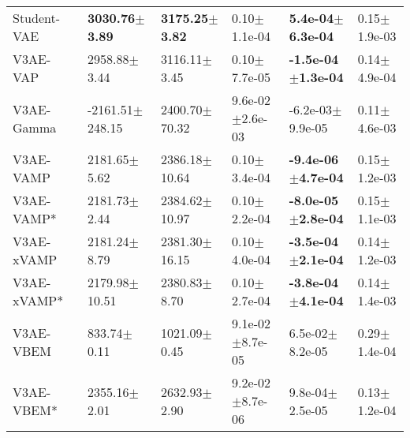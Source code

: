 \begin{tabular}{llllll}
Student-VAE            &  \textbf{3030.76$\pm$3.89} &  \textbf{3175.25$\pm$3.82} &              0.10$\pm$1.1e-04 &   \textbf{5.4e-04$\pm$6.3e-04} &              0.15$\pm$1.9e-03 \\
V3AE-VAP               &           2958.88$\pm$3.44 &           3116.11$\pm$3.45 &              0.10$\pm$7.7e-05 &  \textbf{-1.5e-04$\pm$1.3e-04} &              0.14$\pm$4.9e-04 \\
V3AE-Gamma             &        -2161.51$\pm$248.15 &          2400.70$\pm$70.32 &           9.6e-02$\pm$2.6e-03 &           -6.2e-03$\pm$9.9e-05 &              0.11$\pm$4.6e-03 \\
V3AE-VAMP              &           2181.65$\pm$5.62 &          2386.18$\pm$10.64 &              0.10$\pm$3.4e-04 &  \textbf{-9.4e-06$\pm$4.7e-04} &              0.15$\pm$1.2e-03 \\
V3AE-VAMP*             &           2181.73$\pm$2.44 &          2384.62$\pm$10.97 &              0.10$\pm$2.2e-04 &  \textbf{-8.0e-05$\pm$2.8e-04} &              0.15$\pm$1.1e-03 \\
V3AE-xVAMP             &           2181.24$\pm$8.79 &          2381.30$\pm$16.15 &              0.10$\pm$4.0e-04 &  \textbf{-3.5e-04$\pm$2.1e-04} &              0.14$\pm$1.2e-03 \\
V3AE-xVAMP*            &          2179.98$\pm$10.51 &           2380.83$\pm$8.70 &              0.10$\pm$2.7e-04 &  \textbf{-3.8e-04$\pm$4.1e-04} &              0.14$\pm$1.4e-03 \\
V3AE-VBEM              &            833.74$\pm$0.11 &           1021.09$\pm$0.45 &           9.1e-02$\pm$8.7e-05 &            6.5e-02$\pm$8.2e-05 &              0.29$\pm$1.4e-04 \\
V3AE-VBEM*             &           2355.16$\pm$2.01 &           2632.93$\pm$2.90 &           9.2e-02$\pm$8.7e-06 &            9.8e-04$\pm$2.5e-05 &              0.13$\pm$1.2e-04 \\
\bottomrule
\end{tabular}

